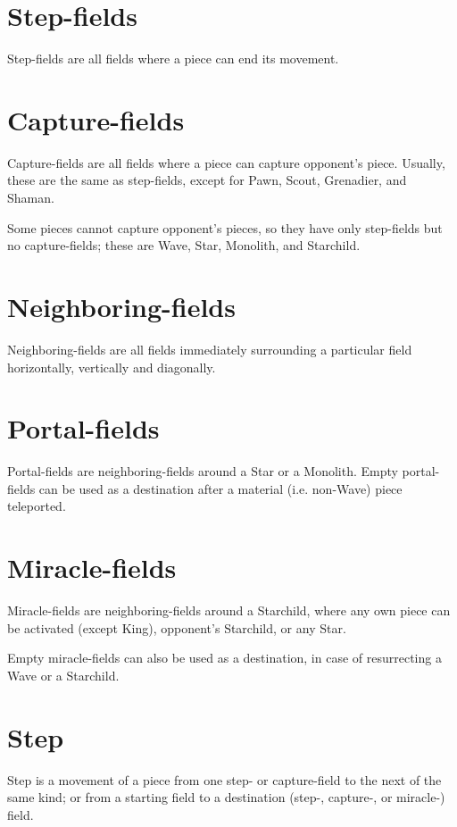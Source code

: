 \section*{Step-fields}
\label{sec:Terms/Step-fields}
Step-fields are all fields where a piece can end its movement.

\section*{Capture-fields}
\label{sec:Terms/Capture-fields}
Capture-fields are all fields where a piece can capture opponent's piece.
Usually, these are the same as step-fields, except for Pawn, Scout, Grenadier,
and Shaman.

Some pieces cannot capture opponent's pieces, so they have only step-fields
but no capture-fields; these are Wave, Star, Monolith, and Starchild.

\section*{Neighboring-fields}
\label{sec:Terms/Neighboring-fields}
Neighboring-fields are all fields immediately surrounding a particular field
horizontally, vertically and diagonally.

\section*{Portal-fields}
\label{sec:Terms/Portal-fields}
Portal-fields are neighboring-fields around a Star or a Monolith. Empty
portal-fields can be used as a destination after a material (i.e. non-Wave)
piece teleported.

\section*{Miracle-fields}
\label{sec:Terms/Royal-fields}
Miracle-fields are neighboring-fields around a Starchild, where any own piece
can be activated (except King), opponent's Starchild, or any Star.

Empty miracle-fields can also be used as a destination, in case of resurrecting
a Wave or a Starchild.

\section*{Step}
\label{sec:Terms/Step}
Step is a movement of a piece from one step- or capture-field to the next of
the same kind; or from a starting field to a destination (step-, capture-, or
miracle-) field.

